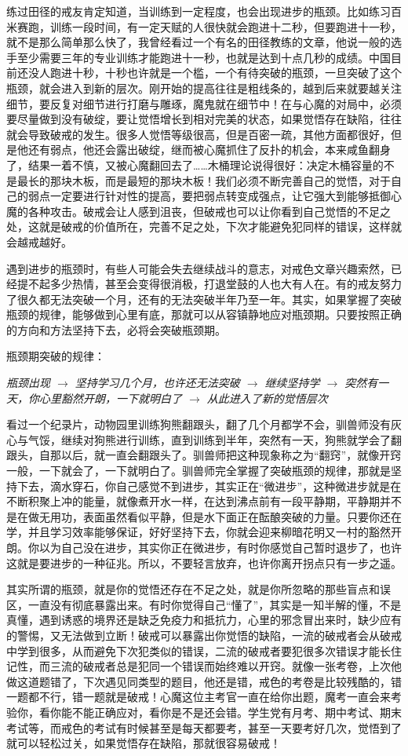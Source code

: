练过田径的戒友肯定知道，当训练到一定程度，也会出现进步的瓶颈。比如练习百米赛跑，训练一段时间，有一定天赋的人很快就会跑进十二秒，但要跑进十一秒，就不是那么简单那么快了，我曾经看过一个有名的田径教练的文章，他说一般的选手至少需要三年的专业训练才能跑进十一秒，也就是达到十点几秒的成绩。中国目前还没人跑进十秒，十秒也许就是一个槛，一个有待突破的瓶颈，一旦突破了这个瓶颈，就会进入到新的层次。刚开始的提高往往是粗线条的，越到后来就要越关注细节，要反复对细节进行打磨与雕琢，魔鬼就在细节中！在与心魔的对局中，必须要尽量做到没有破绽，要让觉悟增长到相对完美的状态，如果觉悟存在缺陷，往往就会导致破戒的发生。很多人觉悟等级很高，但是百密一疏，其他方面都很好，但是他还有弱点，他还会露出破绽，继而被心魔抓住了反扑的机会，本来咸鱼翻身了，结果一着不慎，又被心魔翻回去了……木桶理论说得很好：决定木桶容量的不是最长的那块木板，而是最短的那块木板！我们必须不断完善自己的觉悟，对于自己的弱点一定要进行针对性的提高，要把弱点转变成强点，让它强大到能够抵御心魔的各种攻击。破戒会让人感到沮丧，但破戒也可以让你看到自己觉悟的不足之处，这就是破戒的价值所在，完善不足之处，下次才能避免犯同样的错误，这样就会越戒越好。

遇到进步的瓶颈时，有些人可能会失去继续战斗的意志，对戒色文章兴趣索然，已经提不起多少热情，甚至会变得很消极，打退堂鼓的人也大有人在。有的戒友努力了很久都无法突破一个月，还有的无法突破半年乃至一年。其实，如果掌握了突破瓶颈的规律，能够做到心里有底，那就可以从容镇静地应对瓶颈期。只要按照正确的方向和方法坚持下去，必将会突破瓶颈期。

瓶颈期突破的规律：

\textit{瓶颈出现 $\to$ 坚持学习几个月，也许还无法突破 $\to$ 继续坚持学 $\to$ 突然有一天，你心里豁然开朗，一下就明白了 $\to$ 从此进入了新的觉悟层次}

看过一个纪录片，动物园里训练狗熊翻跟头，翻了几个月都学不会，驯兽师没有灰心与气馁，继续对狗熊进行训练，直到训练到半年，突然有一天，狗熊就学会了翻跟头，自那以后，就一直会翻跟头了。驯兽师把这种现象称之为“翻窍”，就像开窍一般，一下就会了，一下就明白了。驯兽师完全掌握了突破瓶颈的规律，那就是坚持下去，滴水穿石，你自己感觉不到进步，其实正在“微进步”，这种微进步就是在不断积聚上冲的能量，就像煮开水一样，在达到沸点前有一段平静期，平静期并不是在做无用功，表面虽然看似平静，但是水下面正在酝酿突破的力量。只要你还在学，并且学习效率能够保证，好好坚持下去，你就会迎来柳暗花明又一村的豁然开朗。你以为自己没在进步，其实你正在微进步，有时你感觉自己暂时退步了，也许这就是要进步的一种征兆。所以，不要轻言放弃，也许你离开拐点只有一步之遥。

其实所谓的瓶颈，就是你的觉悟还存在不足之处，就是你所忽略的那些盲点和误区，一直没有彻底暴露出来。有时你觉得自己“懂了”，其实是一知半解的懂，不是真懂，遇到诱惑的境界还是缺乏免疫力和抵抗力，心里的邪念冒出来时，缺少应有的警惕，又无法做到立断！破戒可以暴露出你觉悟的缺陷，一流的破戒者会从破戒中学到很多，从而避免下次犯类似的错误，二流的破戒者要犯很多次错误才能长住记性，而三流的破戒者总是犯同一个错误而始终难以开窍。就像一张考卷，上次他做这道题错了，下次遇见同类型的题目，他还是错，戒色的考卷是比较残酷的，错一题都不行，错一题就是破戒！心魔这位主考官一直在给你出题，魔考一直会来考验你，看你能不能正确应对，看你是不是还会错。学生党有月考、期中考试、期末考试等，而戒色的考试有时候甚至是每天都要考，甚至一天要考好几次，觉悟到了就可以轻松过关，如果觉悟存在缺陷，那就很容易破戒！

